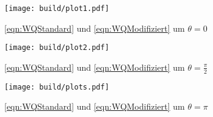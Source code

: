 \begin{figure}
  \centering
  \texttt{[image: build/plot1.pdf]}
  \caption{\eqref{eqn:WQStandard} und \eqref{eqn:WQModifiziert} um $\theta = 0$}
  \label{fig:t0}
\end{figure}

\begin{figure}
  \centering
  \texttt{[image: build/plot2.pdf]}
  \caption{\eqref{eqn:WQStandard} und \eqref{eqn:WQModifiziert} um $\theta = \frac{\pi}{2}$}
  \label{fig:tpi2}
\end{figure}

\begin{figure}
  \centering
  \texttt{[image: build/plots.pdf]}
  \caption{\eqref{eqn:WQStandard} und \eqref{eqn:WQModifiziert} um $\theta = \pi$}
  \label{fig:tpi}
\end{figure}





